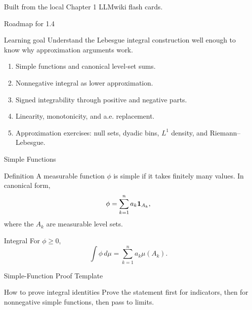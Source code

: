 \begin{frame}
  \titlepage
  \vspace{-5mm}
  \begin{center}
    \small Built from the local Chapter 1 LLMwiki flash cards.
  \end{center}
\end{frame}

\begin{frame}{Roadmap for 1.4}
  \begin{block}{Learning goal}
    Understand the Lebesgue integral construction well enough to know why approximation arguments work.
  \end{block}
  \begin{enumerate}
    \item Simple functions and canonical level-set sums.
    \item Nonnegative integral as lower approximation.
    \item Signed integrability through positive and negative parts.
    \item Linearity, monotonicity, and a.e. replacement.
    \item Approximation exercises: null sets, dyadic bins, $L^1$ density, and Riemann--Lebesgue.
  \end{enumerate}
\end{frame}

\begin{frame}{Simple Functions}
  \begin{block}{Definition}
    A measurable function $\phi$ is simple if it takes finitely many values. In canonical form,
    \[
      \phi=\sum_{k=1}^n a_k\mathbf{1}_{A_k},
    \]
    where the $A_k$ are measurable level sets.
  \end{block}
  \begin{block}{Integral}
    For $\phi\ge0$,
    \[
      \int \phi\,d\mu=\sum_{k=1}^n a_k\mu(A_k).
    \]
  \end{block}
\end{frame}

\begin{frame}{Simple-Function Proof Template}
  \begin{block}{How to prove integral identities}
    Prove the statement first for indicators, then for nonnegative simple functions, then pass to limits.
  \end{block}
\end{frame}

